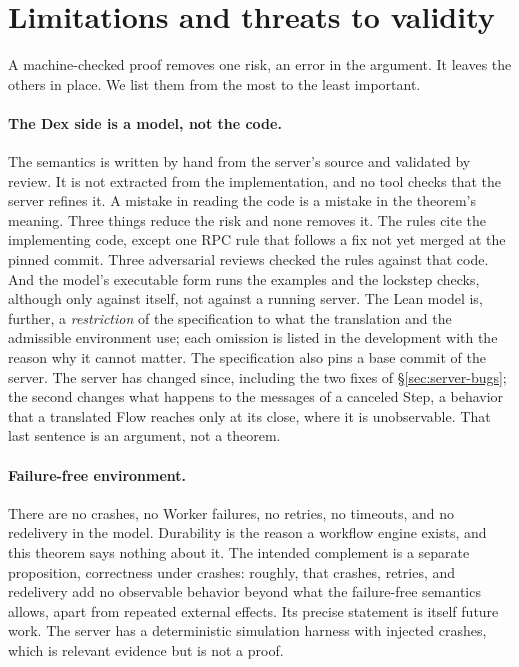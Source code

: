 \section{Limitations and threats to validity}
\label{sec:limitations}

A machine-checked proof removes one risk, an error in the argument. It
leaves the others in place. We list them from the most to the least
important.

\paragraph{The Dex side is a model, not the code.}
The semantics is written by hand from the server's source and validated by
review. It is not extracted from the implementation, and no tool checks
that the server refines it. A mistake in reading the code is a mistake in
the theorem's meaning. Three things reduce the risk and none removes it.
The rules cite the implementing code, except one RPC rule that follows a
fix not yet merged at the pinned commit. Three adversarial reviews checked
the rules against that code. And the model's executable form runs the
examples and the lockstep checks, although only against itself, not against
a running server. The Lean model is, further, a \emph{restriction} of the
specification to what the translation and the admissible environment use;
each omission is listed in the development with the reason why it cannot
matter. The specification also pins a base commit of the server. The server
has changed since, including the two fixes of
\S\ref{sec:server-bugs}; the second changes what happens to the messages of
a canceled Step, a behavior that a translated Flow reaches only at its
close, where it is unobservable. That last sentence is an argument, not a
theorem.

\paragraph{Failure-free environment.}
There are no crashes, no Worker failures, no retries, no timeouts, and no
redelivery in the model. Durability is the reason a workflow engine exists,
and this theorem says nothing about it. The intended complement is a
separate proposition, correctness under crashes: roughly, that crashes,
retries, and redelivery add no observable behavior beyond what the
failure-free semantics allows, apart from repeated external effects. Its
precise statement is itself future work. The server has a
deterministic simulation harness with injected crashes, which is relevant
evidence but is not a proof.

